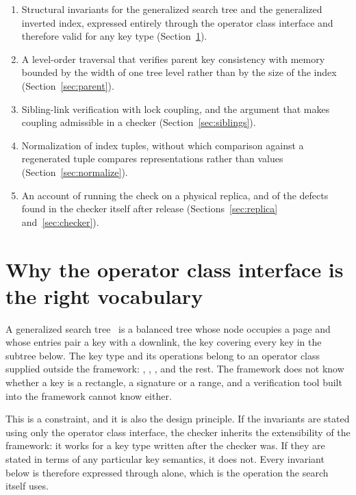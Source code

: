 \begin{enumerate}
\item Structural invariants for the generalized search tree and the generalized
      inverted index, expressed entirely through the operator class interface and
      therefore valid for any key type (Section~\ref{sec:invariants}).
\item A level-order traversal that verifies parent key consistency with memory
      bounded by the width of one tree level rather than by the size of the index
      (Section~\ref{sec:parent}).
\item Sibling-link verification with lock coupling, and the argument that makes
      coupling admissible in a checker (Section~\ref{sec:siblings}).
\item Normalization of index tuples, without which comparison against a
      regenerated tuple compares representations rather than values
      (Section~\ref{sec:normalize}).
\item An account of running the check on a physical replica, and of the defects
      found in the checker itself after release (Sections~\ref{sec:replica}
      and~\ref{sec:checker}).
\end{enumerate}

\section{Why the operator class interface is the right vocabulary}
\label{sec:invariants}

A generalized search tree~\cite{hellerstein1995generalized} is a balanced tree
whose node occupies a page and whose entries pair a key with a downlink, the key
covering every key in the subtree below. The key type and its operations belong
to an operator class supplied outside the framework: ,
, ,  and the rest. The framework does
not know whether a key is a rectangle, a signature or a range, and a verification
tool built into the framework cannot know either.

This is a constraint, and it is also the design principle. If the invariants are
stated using only the operator class interface, the checker inherits the
extensibility of the framework: it works for a key type written after the checker
was. If they are stated in terms of any particular key semantics, it does not.
Every invariant below is therefore expressed through  alone,
which is the operation the search itself uses.

